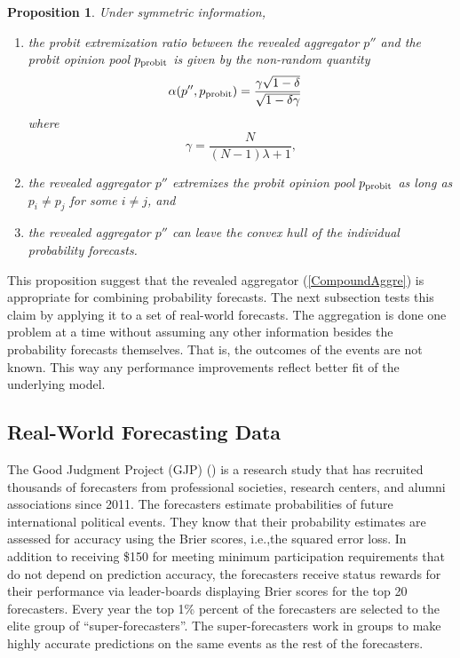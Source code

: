 \documentclass[11pt]{article}
\newtheorem{proposition}[theorem]{Proposition}
\theoremstyle{definition}
\theoremstyle{definition}
\def\probit{p_{\rm probit}}
\begin{document}
\begin{proposition} \label{positiveThm}
Under symmetric information, 
\begin{enumerate}
\item[$(i)$] the probit extremization ratio between the revealed
aggregator $p''$ and the probit opinion pool $\probit$ is given by the
non-random quantity
\begin{align*}
\alpha(p'', \probit)
 &=  \frac{\gamma \sqrt{1 - \delta}}{\sqrt{1-\delta\gamma}}
\end{align*}
where
$$\gamma = \frac{N}{(N-1)\lambda +1},$$
\item[$(ii)$] the revealed aggregator $p''$ extremizes the probit
opinion pool $\probit$ as long as $p_i \neq p_j$ for some $i \neq j$,
and
\item[$(iii)$] the revealed aggregator $p''$ can leave the convex hull
of the individual probability forecasts.
\end{enumerate}
\end{proposition}
This proposition suggest that the revealed aggregator
(\ref{CompoundAggre}) is appropriate for combining probability
forecasts. The next subsection tests this claim by applying it to a set
of real-world forecasts. The aggregation is done one problem at a time
without assuming any other information besides the probability
forecasts themselves. That is, the outcomes of the events are not
known. This way any performance improvements reflect better fit of the
underlying model.



\subsection{Real-World Forecasting Data}
\label{realData}
The Good Judgment Project (GJP) (\citealt{mellers2014psychological,
ungar2012good}) is a research study that has recruited
thousands of forecasters from professional societies, research
centers, and alumni associations since 2011.  The forecasters estimate
probabilities of future international political events.  They know that their
probability estimates are assessed for accuracy using the Brier scores, i.e.,the
squared error loss.  In addition to receiving \$150 for
meeting minimum participation requirements that do not depend on
prediction accuracy, the forecasters receive status rewards for their
performance via leader-boards displaying Brier scores for the top 20
forecasters.  Every year the top 1\% percent of the forecasters are
selected to the elite group of ``super-forecasters''. The
super-forecasters work in groups to make highly accurate predictions
on the same events as the rest of the forecasters.
\end{document}
